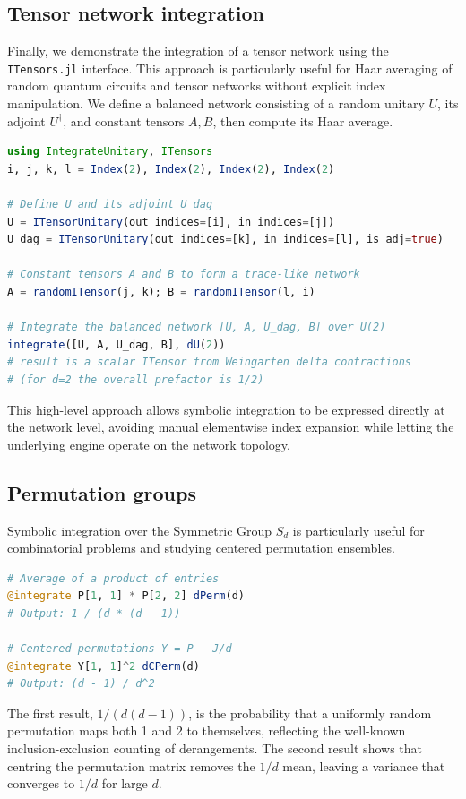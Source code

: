 \documentclass[manuscript,screen]{acmart}
\begin{document}
\subsection{Tensor network integration}
Finally, we demonstrate the integration of a tensor network using the
\texttt{ITensors.jl} interface. This approach is particularly useful for Haar
averaging of random quantum circuits and tensor networks without explicit index
manipulation. We define a balanced network consisting of a random unitary $U$,
its adjoint $U^\dagger$, and constant tensors $A,B$, then compute its Haar
average.

\begin{lstlisting}[language=Julia]
using IntegrateUnitary, ITensors
i, j, k, l = Index(2), Index(2), Index(2), Index(2)

# Define U and its adjoint U_dag
U = ITensorUnitary(out_indices=[i], in_indices=[j])
U_dag = ITensorUnitary(out_indices=[k], in_indices=[l], is_adj=true)

# Constant tensors A and B to form a trace-like network
A = randomITensor(j, k); B = randomITensor(l, i)

# Integrate the balanced network [U, A, U_dag, B] over U(2)
integrate([U, A, U_dag, B], dU(2))
# result is a scalar ITensor from Weingarten delta contractions
# (for d=2 the overall prefactor is 1/2)
\end{lstlisting}

This high-level approach allows symbolic integration to be expressed directly at
the network level, avoiding manual elementwise index expansion while letting the
underlying engine operate on the network topology.
 
\subsection{Permutation groups}
Symbolic integration over the Symmetric Group $S_d$ is particularly useful for
combinatorial problems and studying centered permutation ensembles.
\begin{lstlisting}[language=Julia]
# Average of a product of entries
@integrate P[1, 1] * P[2, 2] dPerm(d)
# Output: 1 / (d * (d - 1))

# Centered permutations Y = P - J/d
@integrate Y[1, 1]^2 dCPerm(d)
# Output: (d - 1) / d^2
\end{lstlisting}

The first result, $1/(d(d-1))$, is the probability that a uniformly random
permutation maps both 1 and 2 to themselves, reflecting the well-known
inclusion-exclusion counting of derangements. The second result shows
that centring the permutation matrix removes the $1/d$ mean, leaving a
variance that converges to $1/d$ for large $d$.
\end{document}
